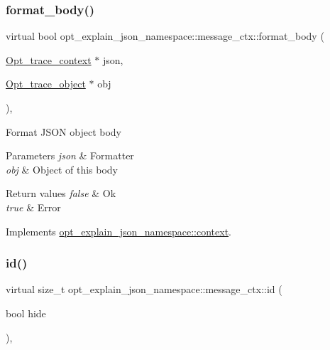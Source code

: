 \subsubsection{\texorpdfstring{format\+\_\+body()}{format\_body()}}
{\footnotesize\ttfamily virtual bool opt\+\_\+explain\+\_\+json\+\_\+namespace\+::message\+\_\+ctx\+::format\+\_\+body (\begin{DoxyParamCaption}\item[{\mbox{\hyperlink{classOpt__trace__context}{Opt\+\_\+trace\+\_\+context}} $\ast$}]{json,  }\item[{\mbox{\hyperlink{classOpt__trace__object}{Opt\+\_\+trace\+\_\+object}} $\ast$}]{obj }\end{DoxyParamCaption})\hspace{0.3cm}{\ttfamily [inline]}, {\ttfamily [virtual]}}

Format J\+S\+ON object body


\begin{DoxyParams}{Parameters}
{\em json} & Formatter \\
\hline
{\em obj} & Object of this body\\
\hline
\end{DoxyParams}

\begin{DoxyRetVals}{Return values}
{\em false} & Ok \\
\hline
{\em true} & Error \\
\hline
\end{DoxyRetVals}


Implements \mbox{\hyperlink{classopt__explain__json__namespace_1_1context}{opt\+\_\+explain\+\_\+json\+\_\+namespace\+::context}}.

\mbox{\label{classopt__explain__json__namespace_1_1message__ctx_a76f2d4b59c3707aa67afef272d4a00ca}} 
\subsubsection{\texorpdfstring{id()}{id()}}
{\footnotesize\ttfamily virtual size\+\_\+t opt\+\_\+explain\+\_\+json\+\_\+namespace\+::message\+\_\+ctx\+::id (\begin{DoxyParamCaption}\item[{bool}]{hide }\end{DoxyParamCaption})\hspace{0.3cm}{\ttfamily [inline]}, {\ttfamily [virtual]}}

